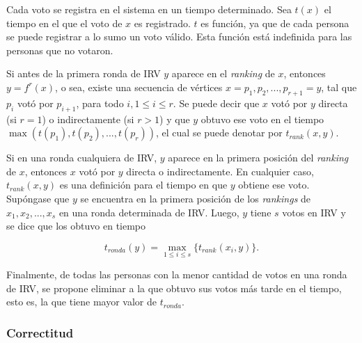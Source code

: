 Cada voto se registra en el sistema en un tiempo determinado. Sea $t(x)$ el tiempo en el que el voto de $x$ es registrado. $t$ es funci\'on, ya que de cada persona se puede registrar a lo sumo un voto v\'alido. Esta funci\'on est\'a indefinida para las personas que no votaron.

Si antes de la primera ronda de IRV $y$ aparece en el \textit{ranking} de $x$, entonces $y = f^r(x)$, o sea, existe una secuencia de v\'ertices $x = p_1, p_2, ..., p_{r+1} = y$, tal que $p_i$ vot\'o por $p_{i+1}$, para todo $i, 1 \leq i \leq r$.  Se puede decir que $x$ vot\'o por $y$ directa (si $r=1$) o indirectamente (si $r>1$) y que $y$ obtuvo ese voto en el tiempo $\max (t(p_1), t(p_2), ..., t(p_r))$, el cual se puede denotar por $t_{rank}(x, y)$. 

Si en una ronda cualquiera de IRV, $y$ aparece en la primera posici\'on del \textit{ranking} de $x$, entonces $x$ vot\'o por $y$ directa o indirectamente. En cualquier caso, $t_{rank}(x, y)$ es una definici\'on para el tiempo en que $y$ obtiene ese voto. Sup\'ongase que $y$ se encuentra en la primera posici\'on de los \textit{rankings} de $x_1, x_2, ..., x_s$ en una ronda determinada de IRV. Luego, $y$ tiene $s$ votos en IRV y se dice que los obtuvo en tiempo 

\begin{equation}\label{eq:max-rank-time}
   t_{ronda}(y) = \underset{1 \leq i \leq s}{\max} \{ t_{rank}(x_i, y) \}. 
\end{equation}

Finalmente, de todas las personas con la menor cantidad de votos en una ronda de IRV, se propone eliminar a la que obtuvo sus votos m\'as tarde en el tiempo, esto es, la que tiene mayor valor  de $t_{ronda}$.

\subsubsection{Correctitud}




